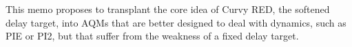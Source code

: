 This memo proposes to transplant the core idea of Curvy RED, the softened delay target, into AQMs that are better designed to deal with dynamics, such as PIE or PI2, but that suffer from the weakness of a fixed delay target.

